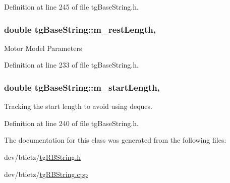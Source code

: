 Definition at line 245 of file tg\-Base\-String.\-h.

\hypertarget{classtg_base_string_a7e5cf579c266faed950ee215bf1bc596}{
\subsubsection[{m\-\_\-rest\-Length}]{\setlength{\rightskip}{0pt plus 5cm}double tg\-Base\-String\-::m\-\_\-rest\-Length\hspace{0.3cm}{\ttfamily [protected]}, {\ttfamily [inherited]}}}\label{classtg_base_string_a7e5cf579c266faed950ee215bf1bc596}
Motor Model Parameters 

Definition at line 233 of file tg\-Base\-String.\-h.

\hypertarget{classtg_base_string_a14e96c33278197f084ee733b93123b0e}{
\subsubsection[{m\-\_\-start\-Length}]{\setlength{\rightskip}{0pt plus 5cm}double tg\-Base\-String\-::m\-\_\-start\-Length\hspace{0.3cm}{\ttfamily [protected]}, {\ttfamily [inherited]}}}\label{classtg_base_string_a14e96c33278197f084ee733b93123b0e}
Tracking the start length to avoid using deques. 

Definition at line 240 of file tg\-Base\-String.\-h.



The documentation for this class was generated from the following files\-:\begin{DoxyCompactItemize}
\item 
dev/btietz/\hyperlink{tg_r_b_string_8h}{tg\-R\-B\-String.\-h}\item 
dev/btietz/\hyperlink{tg_r_b_string_8cpp}{tg\-R\-B\-String.\-cpp}\end{DoxyCompactItemize}
